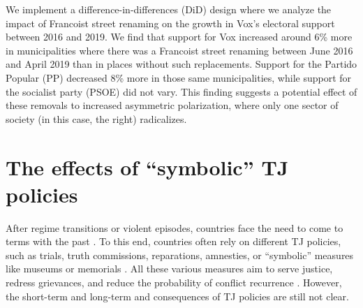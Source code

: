 \documentclass[12pt, titlepage]{article}
\begin{document}
We implement a difference-in-differences (DiD) design where we analyze the impact of Francoist street renaming on the growth in Vox's electoral support between 2016 and 2019.
We find that support for Vox increased around 6\% more in municipalities where there was a Francoist street renaming between June 2016 and April 2019 than in places without such replacements. Support for the Partido Popular (PP) decreased 8\% more in those same municipalities, while support for the socialist party (PSOE) did not vary. This finding suggests a potential effect of these removals to increased asymmetric polarization, where only one sector of society (in this case, the right) radicalizes.


\section*{The effects of ``symbolic'' TJ policies}

After regime transitions or violent episodes, countries face the need to come to terms with the past \citep{Elster:2004aa}. To this end, countries often rely on different TJ policies, such as trials, truth commissions, reparations, amnesties, or ``symbolic'' measures like museums or memorials \citep{De-Brito:2001aa, Elster:2004aa, Balasco:2013aa}. All these various measures aim to serve justice, redress grievances, and reduce the probability of conflict recurrence \citep{Loyle:2017aa}. However, the short-term and long-term and consequences of TJ policies are still not clear.
\end{document}
